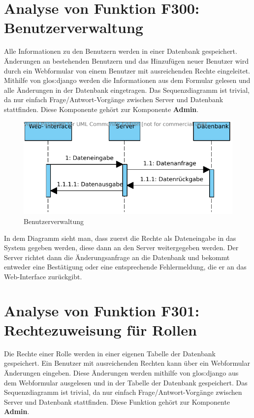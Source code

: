\section{Analyse von Funktion F300: Benutzerverwaltung}
Alle Informationen zu den Benutzern werden in einer Datenbank gespeichert. Änderungen an bestehenden Benutzern und das Hinzufügen neuer Benutzer wird durch ein Webformular von einem Benutzer mit ausreichenden Rechte eingeleitet. Mithilfe von \gls{glos:django} werden die Informationen aus dem Formular gelesen und alle Änderungen in der Datenbank eingetragen. Das Sequenzdiagramm ist trivial, da nur einfach Frage/Antwort-Vorgänge zwischen Server und Datenbank stattfinden. Diese Komponente gehört zur Komponente \textbf{Admin}.

\begin{figure}[h]
\includegraphics[width=0.8\linewidth]{bilder/f300.pdf}
\caption[Benutzerverwaltung]{Benutzerverwaltung}
\label{fig:300}
\end{figure}

In dem Diagramm sieht man, dass zuerst die Rechte als Dateneingabe in das
System gegeben werden, diese dann an den Server weitergegeben werden. Der
Server richtet dann die Änderungsanfrage an die Datenbank und bekommt entweder
eine Bestätigung oder eine entsprechende Fehlermeldung, die er an das
Web-Interface zurückgibt.

\section{Analyse von Funktion F301: Rechtezuweisung für Rollen}
Die Rechte einer Rolle werden in einer eigenen Tabelle der Datenbank gespeichert. Ein Benutzer mit ausreichenden Rechten kann über ein Webformular Änderungen eingeben. Diese Änderungen werden mithilfe von \gls{glos:django} aus dem Webformular ausgelesen und in der Tabelle der Datenbank gespeichert. Das Sequenzdiagramm ist trivial, da nur einfach Frage/Antwort-Vorgänge zwischen Server und Datenbank stattfinden. Diese Funktion gehört zur Komponente \textbf{Admin}.


